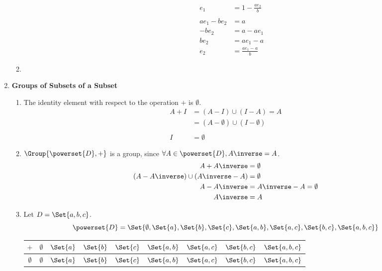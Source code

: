 \begin{enumerate}[label={\Alph*.},font={\bfseries}]
\begin{enumerate}[label={\arabic*},font={\bfseries}]
\begin{enumerate}[label={(\roman*)}]
\begin{align*}
        e_1 &= 1 - \frac{ae_2}{b} \\
        \\
        ae_1-be_2 &= a \\
        -be_2 &= a-ae_1 \\
        be_2 &= ae_1-a \\
        e_2 &= \frac{ae_1-a}{b}
      \end{align*}
    \end{enumerate}
    \item {}
  \end{enumerate}
\item {\bf Groups of Subsets of a Subset}
  \begin{enumerate}[label={\arabic*},font={\bfseries}]
  \item The identity element with respect to the operation $+$ is $\emptyset$.
    \begin{align*}
      A+I &= (A-I) \cup (I-A) = A \\
      &= (A-\emptyset) \cup (I-\emptyset) \\
      \\
      I &= \emptyset
    \end{align*}
  \item $\Group{\powerset{D}, +}$ is a group, since
    $\forall A \in \powerset{D}, A\inverse = A$.
    \begin{align*}
      A+A\inverse &= \emptyset \\
      (A-A\inverse) \cup (A\inverse-A) &= \emptyset \\
      A-A\inverse &= A\inverse-A = \emptyset \\
      A\inverse &= A
    \end{align*}
  \item Let $D = \Set{a,b,c}$.
    \[
    \powerset{D} = \Set{
      \emptyset,
      \Set{a}, \Set{b}, \Set{c},
      \Set{a,b}, \Set{a,c}, \Set{b,c},
      \Set{a,b,c}
    }
    \]
    \begin{center}
      \begin{tabular}{ c | c c c c c c c c}
        $+$ & $\emptyset$ & $\Set{a}$ & $\Set{b}$ & $\Set{c}$ & $\Set{a,b}$ & $\Set{a,c}$ & $\Set{b,c}$ & $\Set{a,b,c}$ \\
        \hline
        $\emptyset$ & $\emptyset$ & $\Set{a}$ & $\Set{b}$ & $\Set{c}$ & $\Set{a,b}$ & $\Set{a,c}$ & $\Set{b,c}$ & $\Set{a,b,c}$ \\

\end{tabular}
\end{center}
\end{enumerate}
\end{enumerate}
